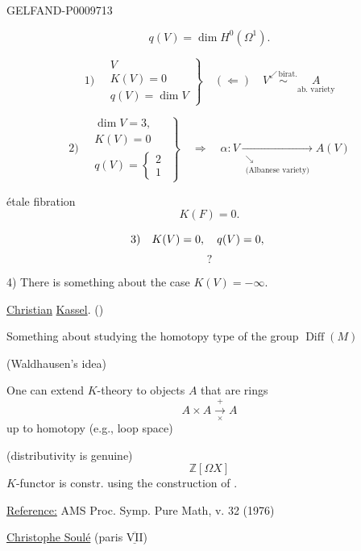 \begin{GelfandAdjacentEvidence}{GELFAND-P000971}{3}


\[
 q(V)=\dim H^0(\Omega^1).
\]

\[
 1)\quad
 \left.\begin{gathered} V\\ K(V)=0\\ q(V)=\dim V \end{gathered}\right\}
 \quad(\Leftarrow)\quad
 V\overset{\swarrow\,\text{birat.}}{\sim}\underset{\text{ab. variety}}{A}
\]

\[
 2)\quad
 \left.\begin{gathered}
 \dim V=3,\\K(V)=0\\q(V)=\begin{cases}2\\1\end{cases}
 \end{gathered}\right\}
 \quad\Rightarrow\quad
 \alpha\colon V\underset{\substack{\searrow\\\text{(Albanese variety)}}}{\longrightarrow}A(V)
\]

étale fibration
\[
 K(F)=0.
\]

\[
 3)\quad K(V)=0,\quad q(V)=0,
 \qquad\text{\vphantom{$K(V)$}}
\]
\[
 ?
\]

4) There is something about the case $K(V)=-\infty$.

\underline{Christian} \underline{Kassel}. ()

Something about studying the homotopy type of the group $\operatorname{Diff}(M)$

(Waldhausen’s idea)

One can extend $K$-theory to objects $A$ that are rings
\[
 A\times A\overset{+}{\underset{\times}{\longrightarrow}}A
\]
up to homotopy (e.g., loop space)

(distributivity is genuine)
\[
 \mathbb Z[\Omega X]
\]
$K$-functor is constr. using the construction of .

\underline{Reference:} AMS Proc. Symp. Pure Math, v. 32 (1976)


\underline{Christophe Soulé} (paris \(\underline{\overline{\mathrm{VII}}}\))
\end{GelfandAdjacentEvidence}

